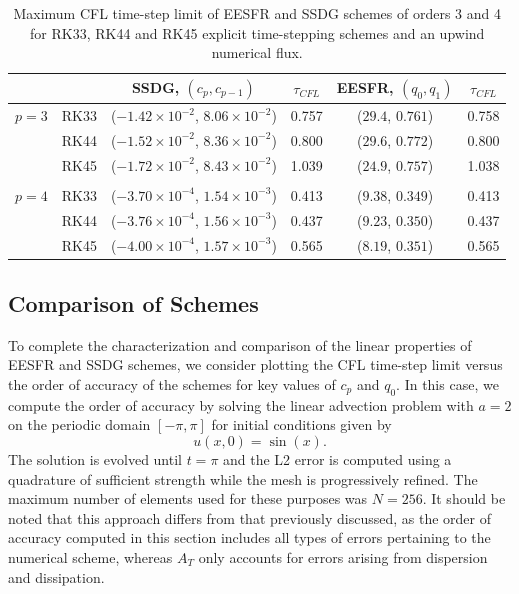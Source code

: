 \documentclass[preprint,12pt]{elsarticle}
\begin{document}
\begin{table}
    \centering
    \begin{tabular}{cc|cc|cc}
         & & SSDG, $(c_{p}, c_{p-1})$  & $\tau_{CFL}$ & EESFR, $(q_0, q_1)$  & $\tau_{CFL}$  \\
         \hline
         $p=3$ & RK33  & ($-1.42 \times 10^{-2}$, $8.06 \times 10^{-2}$)  & 0.757 & ($29.4$, $0.761$)
         & 0.758 \\
         & RK44 & ($-1.52 \times 10^{-2}$, $8.36 \times 10^{-2}$) & 0.800 & ($29.6$, $0.772$) & 0.800 \\
         & RK45& ($-1.72 \times 10^{-2}$, $8.43 \times 10^{-2}$)  & 1.039 & ($24.9$, $0.757$) & 1.038 \\
         & &  & \\
         $p=4$ & RK33  & ($-3.70 \times 10^{-4}$, $1.54 \times 10^{-3}$)  &  0.413 & ($9.38$, $0.349$) & 0.413\\
         & RK44 & ($-3.76 \times 10^{-4}$, $1.56 \times 10^{-3}$) & 0.437 & ($9.23$, $0.350$) & 0.437  \\
         & RK45 & ($-4.00 \times 10^{-4}$, $1.57 \times 10^{-3}$)  & 0.565 & ($8.19$, $0.351$) & 0.565 \\
    \end{tabular}
    \caption{Maximum CFL time-step limit of EESFR and SSDG schemes of orders 3 and 4 for RK33, RK44 and RK45 explicit time-stepping schemes and an upwind numerical flux.}
    \label{tab:max_CFL}
\end{table}

\subsection{Comparison of Schemes}
To complete the characterization and comparison of the linear properties of EESFR and SSDG schemes, we consider plotting the CFL time-step limit versus the order of accuracy of the schemes for key values of $c_p$ and $q_0$. In this case, we compute the order of accuracy by solving the linear advection problem with $a=2$ on the periodic domain $[-\pi, \pi]$ for initial conditions given by
\begin{equation}
    u(x,0) = \sin(x).
\end{equation}
The solution is evolved until $t = \pi$ and the L2 error is computed using a quadrature of sufficient strength while the mesh is progressively refined. The maximum number of elements used for these purposes was $N=256$. It should be noted that this approach differs from that previously discussed, as the order of accuracy computed in this section includes all types of errors pertaining to the numerical scheme, whereas $A_T$ only accounts for errors arising from dispersion and dissipation.
\end{document}
